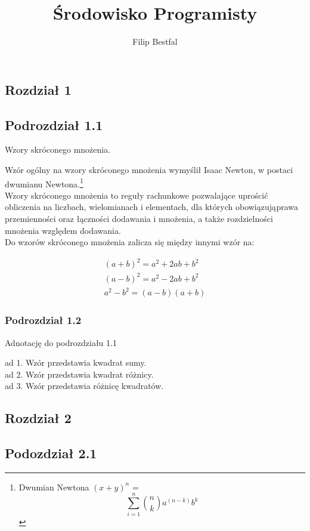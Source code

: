 \documentclass[11pt]{article}
\title{Środowisko Programisty}
\author{Filip Bestfal}
\begin{document}
\maketitle
\newpage
\tableofcontents
\listoffigures
\newpage
\begin{center}
\section{Rozdział 1}
\subsection{Podrozdział 1.1}
\end{center}
\begin{center}
Wzory skróconego mnożenia.
\end{center}
\begin{flushleft}
\label{1}
Wzór ogólny na wzory skróconego mnożenia wymyślił Isaac Newton, w postaci dwumianu Newtona.\footnote {Dwumian Newtona {$(x+y)^n$ = $${\sum_{i=1}^{n} }
{n \choose k} {a^{(n-k)}b^k}$$}}\\
Wzory skróconego mnożenia to reguły rachunkowe pozwalające uprościć obliczenia na liczbach, wielomianach i elementach, dla których obowiązująprawa przemienności oraz łączności dodawania i mnożenia, a także rozdzielności mnożenia względem dodawania.\\
Do wzorów skróconego mnożenia zalicza się między innymi wzór na:
\end{flushleft}
\begin{flushleft}
\begin{eqnarray}
(a+b)^2 = a^2 + 2ab + b^2\\
(a-b)^2 = a^2 - 2ab + b^2\\
a^2 - b^2 = (a-b)(a+b)
\end{eqnarray}
\end{flushleft}
\begin{center}
\subsubsection{Podrozdział 1.2}
\end{center}
\begin{center}
Adnotację do podrozdziału 1.1
\end{center}
ad 1. Wzór przedstawia kwadrat sumy.\\
ad 2. Wzór przedstawia kwadrat różnicy.\\
ad 3. Wzór przedstawia różnicę kwadratów.
\newpage
\begin{center}
\section{Rozdział 2}
\subsection{Podozdział 2.1}
\end{center}
\end{document}
